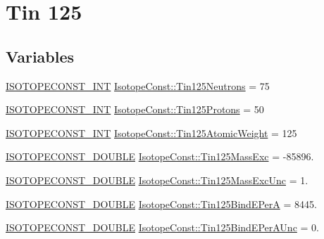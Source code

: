 \hypertarget{group___isotope_const-_tin-_sn125}{}\section{Tin 125}
\label{group___isotope_const-_tin-_sn125}
\subsection*{Variables}
\begin{DoxyCompactItemize}
\item 
\mbox{\hyperlink{group___isotope_const-_macros_ga5f18360b3e99483a35c32d789e62621c}{I\+S\+O\+T\+O\+P\+E\+C\+O\+N\+S\+T\+\_\+\+I\+NT}} \mbox{\hyperlink{group___isotope_const-_tin-_sn125_ga9f7de5ebbc640733e08e1519b0730b9b}{Isotope\+Const\+::\+Tin125\+Neutrons}} = 75
\item 
\mbox{\hyperlink{group___isotope_const-_macros_ga5f18360b3e99483a35c32d789e62621c}{I\+S\+O\+T\+O\+P\+E\+C\+O\+N\+S\+T\+\_\+\+I\+NT}} \mbox{\hyperlink{group___isotope_const-_tin-_sn125_ga3bb3fec193e597b5c9cfad7520a2cc06}{Isotope\+Const\+::\+Tin125\+Protons}} = 50
\item 
\mbox{\hyperlink{group___isotope_const-_macros_ga5f18360b3e99483a35c32d789e62621c}{I\+S\+O\+T\+O\+P\+E\+C\+O\+N\+S\+T\+\_\+\+I\+NT}} \mbox{\hyperlink{group___isotope_const-_tin-_sn125_gab697f3550b03c3251bf1db919b042072}{Isotope\+Const\+::\+Tin125\+Atomic\+Weight}} = 125
\item 
\mbox{\hyperlink{group___isotope_const-_macros_ga8f45a7272ce02c0b4c65c44636ed719a}{I\+S\+O\+T\+O\+P\+E\+C\+O\+N\+S\+T\+\_\+\+D\+O\+U\+B\+LE}} \mbox{\hyperlink{group___isotope_const-_tin-_sn125_ga1efae6dafda2c46a66914e699d32c961}{Isotope\+Const\+::\+Tin125\+Mass\+Exc}} = -\/85896.
\item 
\mbox{\hyperlink{group___isotope_const-_macros_ga8f45a7272ce02c0b4c65c44636ed719a}{I\+S\+O\+T\+O\+P\+E\+C\+O\+N\+S\+T\+\_\+\+D\+O\+U\+B\+LE}} \mbox{\hyperlink{group___isotope_const-_tin-_sn125_ga382c84602de16efcb1ab1cb48fb81007}{Isotope\+Const\+::\+Tin125\+Mass\+Exc\+Unc}} = 1.
\item 
\mbox{\hyperlink{group___isotope_const-_macros_ga8f45a7272ce02c0b4c65c44636ed719a}{I\+S\+O\+T\+O\+P\+E\+C\+O\+N\+S\+T\+\_\+\+D\+O\+U\+B\+LE}} \mbox{\hyperlink{group___isotope_const-_tin-_sn125_ga07bedd243e6c3301926f94cfa5f9cd2a}{Isotope\+Const\+::\+Tin125\+Bind\+E\+PerA}} = 8445.
\item 
\mbox{\hyperlink{group___isotope_const-_macros_ga8f45a7272ce02c0b4c65c44636ed719a}{I\+S\+O\+T\+O\+P\+E\+C\+O\+N\+S\+T\+\_\+\+D\+O\+U\+B\+LE}} \mbox{\hyperlink{group___isotope_const-_tin-_sn125_ga755d06a9157f4a595f0dcc515b75cd6a}{Isotope\+Const\+::\+Tin125\+Bind\+E\+Per\+A\+Unc}} = 0.

\end{DoxyCompactItemize}
